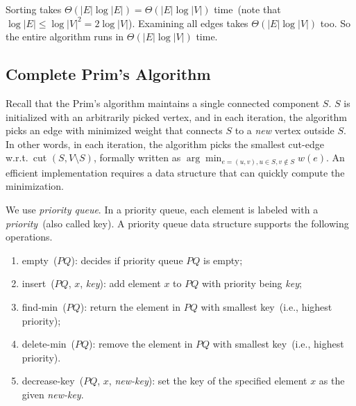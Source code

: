 \begin{algorithmblock}[0.8\textwidth]
	\xxx
	\xxx
	\xxx
	\xxx
	\xxx
	\xxx
	\xxx
	\xxx
	\xxx
	\xxx
\end{algorithmblock}

Sorting takes $\Theta(|E|\log|E|) = \Theta(|E|\log|V|)$ time~(note that $\log |E| \le \log |V|^2 = 2\log |V|$).
Examining all edges takes $\Theta(|E|\log|V|)$ too.
So the entire algorithm runs in $\Theta(|E|\log|V|)$ time.


\subsection*{Complete Prim's Algorithm}

Recall that the Prim's algorithm maintains a single connected component $S$.
$S$ is initialized with an arbitrarily picked vertex, and in each iteration,
the algorithm picks an edge with minimized weight that connects $S$ to a \emph{new} vertex outside $S$.
In other words, in each iteration, the algorithm picks the smallest cut-edge w.r.t.\ cut $(S, V\setminus S)$,
formally written as $\arg\min_{e=(u,v), u\in S, v\not\in S} w(e)$.
An efficient implementation requires a data structure that can quickly compute the minimization.

We use \emph{priority queue}.
In a priority queue, each element is labeled with a \emph{priority}~(also called key).
A {priority queue} data structure supports the following operations.
\begin{enumerate}
\item empty~($PQ$): decides if priority queue $PQ$ is empty;
\item insert~($PQ$, $x$, \emph{key}): add element $x$ to $PQ$ with priority being \emph{key};
\item find-min~($PQ$): return the element in $PQ$ with smallest key~(i.e., highest priority);
\item delete-min~($PQ$): remove the element in $PQ$ with smallest key~(i.e., highest priority).
\item decrease-key~($PQ$, $x$, \emph{new-key}): set the key of the specified element $x$ as the given \emph{new-key}.
\end{enumerate}

